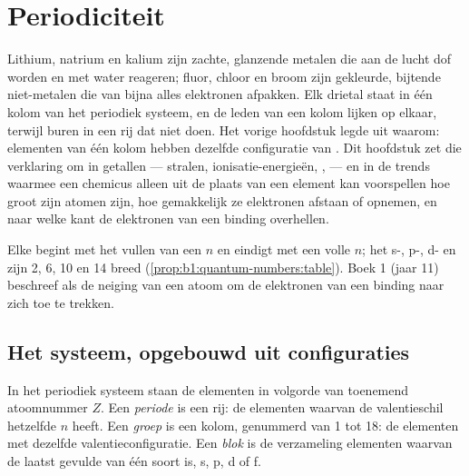 \chapter{Periodiciteit}\label{ch:b1:periodicity}

Lithium, natrium en kalium zijn zachte, glanzende metalen die aan de lucht
dof worden en met water reageren; fluor, chloor en broom zijn gekleurde,
bijtende niet-metalen die van bijna alles elektronen afpakken. Elk
drietal staat in één kolom van het periodiek systeem, en de leden van een
kolom lijken op elkaar, terwijl buren in een rij dat niet doen. Het
vorige hoofdstuk legde uit waarom: elementen van één kolom hebben dezelfde
configuratie van . Dit hoofdstuk zet die verklaring om
in getallen --- stralen, ionisatie-energieën, ,
 --- en in de trends waarmee een chemicus alleen uit
de plaats van een element kan voorspellen hoe groot zijn atomen zijn, hoe
gemakkelijk ze elektronen afstaan of opnemen, en naar welke kant de
elektronen van een binding overhellen.

\begin{recall}
Elke  begint met het vullen van een $n$ en eindigt met
een volle $n$; het s-, p-, d- en  zijn 2, 6, 10 en 14
breed (\cref{prop:b1:quantum-numbers:table}). Boek 1 (jaar 11) beschreef
 als de neiging van een atoom om de elektronen van een
binding naar zich toe te trekken.
\end{recall}

\section{Het systeem, opgebouwd uit configuraties}

\begin{definition}\label{def:b1:periodicity:table}
In het periodiek systeem staan de elementen in volgorde van toenemend
atoomnummer $Z$. Een \emph{periode} is een rij: de
elementen waarvan de valentieschil hetzelfde  $n$ heeft.
Een \emph{groep} is een kolom, genummerd van 1 tot 18: de
elementen met dezelfde valentieconfiguratie. Een \emph{blok}
is de verzameling elementen waarvan de laatst gevulde  van één
soort is, s, p, d of f.
\end{definition}

